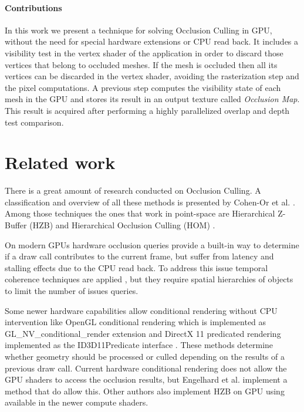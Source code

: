 \documentclass[10pt, conference]{IEEEtran}
\begin{document}
\paragraph*{Contributions}
%
In this work we present a technique for solving Occlusion Culling in GPU, without the need for special hardware extensions or CPU read back. 
It includes a visibility test in the vertex shader of the application in order to discard those vertices that belong to occluded meshes. 
If the mesh is occluded then all its vertices can be discarded in the vertex shader, avoiding the rasterization step and the pixel computations. 
A previous step computes the visibility state of each mesh in the GPU and stores its result in an output texture called \emph{Occlusion Map}. 
This result is acquired after performing a highly parallelized overlap and depth test comparison.


\section{Related work}
%
There is a great amount of research conducted on Occlusion Culling. 
A classification and overview of all these methods is presented by Cohen-Or et al. \cite{survey_visibility}. 
Among those techniques the ones that work in point-space are Hierarchical Z-Buffer (HZB) \cite{Hierarchical_zbuffer} and Hierarchical Occlusion Culling (HOM) \cite{hom}.\

On modern GPUs hardware occlusion queries \cite{nv_occlusion_queries} provide a built-in way to determine if a draw call contributes to the current frame, 
but suffer from latency and stalling effects due to the CPU read back. 
To address this issue temporal coherence techniques are applied \cite{occlusion_queries_2, occlusion_queries_3}, but they require spatial hierarchies of objects to limit the number 
of issues queries.\

Some newer hardware capabilities allow conditional rendering without CPU intervention like OpenGL conditional rendering  which is implemented as 
GL\_NV\_conditional\_render \cite{nv_conditional_render} extension and DirectX 11 predicated rendering implemented as the ID3D11Predicate interface \cite{dx_predicate_rendering}. 
These methods determine whether geometry should be processed or culled depending on the results of a previous draw call. 
Current hardware conditional rendering does not allow the GPU shaders to access the occlusion results, but Engelhard et al. \cite{visibility_queries} implement a method that do allow this. 
Other authors \cite{rakos,darnell} also implement HZB on GPU using available in the newer compute shaders.\
\end{document}
